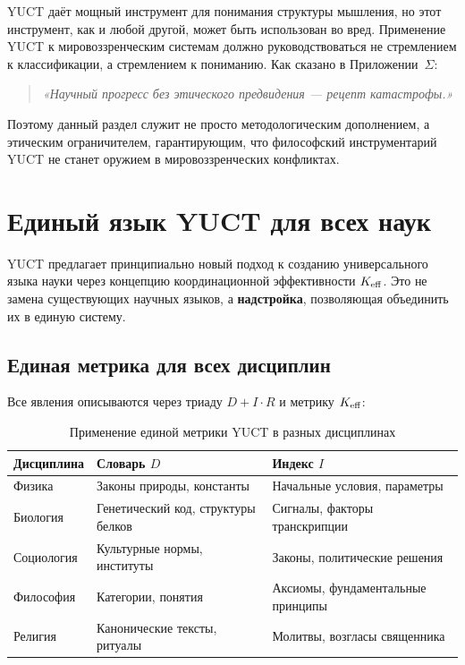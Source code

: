\documentclass[12pt,a4paper]{article}
\begin{document}
	YUCT даёт мощный инструмент для понимания структуры мышления, но этот инструмент, как и любой другой, может быть использован во вред. Применение YUCT к мировоззренческим системам должно руководствоваться не стремлением к классификации, а стремлением к пониманию. Как сказано в Приложении~$\Sigma$:
	
	\begin{quote}
		\itshape
		«Научный прогресс без этического предвидения — рецепт катастрофы.»
	\end{quote}
	
	Поэтому данный раздел служит не просто методологическим дополнением, а этическим ограничителем, гарантирующим, что философский инструментарий YUCT не станет оружием в мировоззренческих конфликтах.
	
	
	\section{Единый язык YUCT для всех наук}
	
	YUCT предлагает принципиально новый подход к созданию универсального языка науки через концепцию координационной эффективности \(\Keff\). Это не замена существующих научных языков, а \textbf{надстройка}, позволяющая объединить их в единую систему.
	
	\subsection{Единая метрика для всех дисциплин}
	
	Все явления описываются через триаду \(D + I \cdot R\) и метрику \(\Keff\):
	
	\begin{table}[H]
		\centering
		\caption{Применение единой метрики YUCT в разных дисциплинах}
		\label{tab:unified-metrics}
		\begin{tabular}{p{3.5cm}p{4.5cm}p{4.5cm}}
			\toprule
			\textbf{Дисциплина} & \textbf{Словарь \(D\)} & \textbf{Индекс \(I\)} \\
			\midrule
			Физика & Законы природы, константы & Начальные условия, параметры \\
			Биология & Генетический код, структуры белков & Сигналы, факторы транскрипции \\
			Социология & Культурные нормы, институты & Законы, политические решения \\
			Философия & Категории, понятия & Аксиомы, фундаментальные принципы \\
			Религия & Канонические тексты, ритуалы & Молитвы, возгласы священника \\
			\bottomrule
		\end{tabular}
	\end{table}
	
\end{document}
